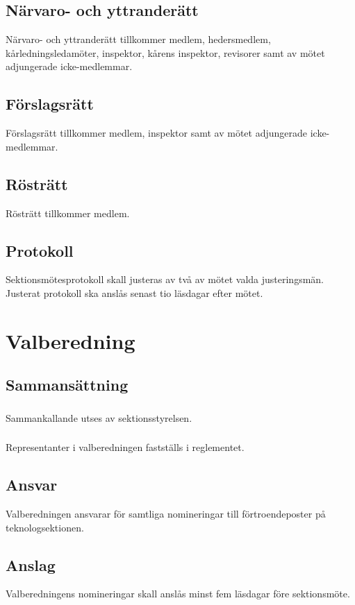 \documentclass[a4paper]{dtek}
\begin{document}
\subsection{Närvaro- och yttranderätt}
Närvaro- och yttranderätt tillkommer medlem, hedersmedlem, kårledningsledamöter, inspektor, kårens inspektor, revisorer samt av mötet adjungerade icke-medlemmar.
\subsection{Förslagsrätt}
Förslagsrätt tillkommer medlem, inspektor samt av mötet adjungerade icke-medlemmar.
\subsection{Rösträtt}
Rösträtt tillkommer medlem.
\subsection{Protokoll}
Sektionsmötesprotokoll skall justeras av två av mötet valda justeringsmän. Justerat protokoll ska anslås senast tio läsdagar efter mötet.
\newpage

\section{Valberedning}
\subsection{Sammansättning}
\subsubsection{}
Sammankallande utses av sektionsstyrelsen.
\subsubsection{}
Representanter i valberedningen fastställs i reglementet.
\subsection{Ansvar}
Valberedningen ansvarar för samtliga nomineringar till förtroendeposter på teknologsektionen.
\subsection{Anslag}
Valberedningens nomineringar skall anslås minst fem läsdagar före sektionsmöte.
\end{document}
